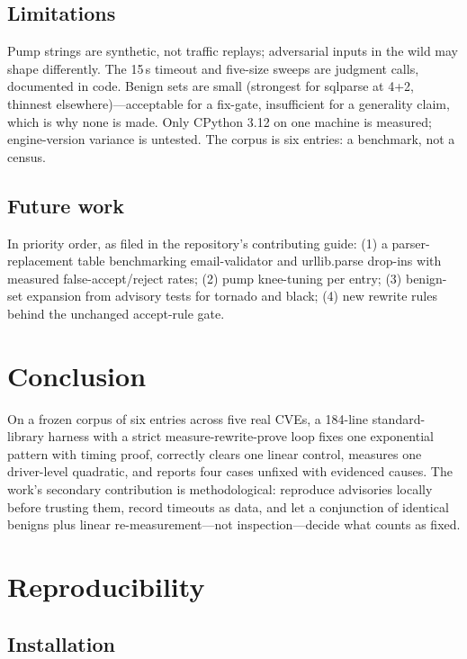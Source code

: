 \documentclass[11pt,a4paper]{article}
\begin{document}
\subsection{Limitations}

Pump strings are synthetic, not traffic replays; adversarial inputs in the wild may shape differently. The 15\,s timeout and five-size sweeps are judgment calls, documented in code. Benign sets are small (strongest for sqlparse at 4+2, thinnest elsewhere)---acceptable for a fix-gate, insufficient for a generality claim, which is why none is made. Only CPython 3.12 on one machine is measured; engine-version variance is untested. The corpus is six entries: a benchmark, not a census.

\subsection{Future work}

In priority order, as filed in the repository's contributing guide: (1) a parser-replacement table benchmarking email-validator and urllib.parse drop-ins with measured false-accept/reject rates; (2) pump knee-tuning per entry; (3) benign-set expansion from advisory tests for tornado and black; (4) new rewrite rules behind the unchanged accept-rule gate.

\section{Conclusion}

On a frozen corpus of six entries across five real CVEs, a 184-line standard-library harness with a strict measure-rewrite-prove loop fixes one exponential pattern with timing proof, correctly clears one linear control, measures one driver-level quadratic, and reports four cases unfixed with evidenced causes. The work's secondary contribution is methodological: reproduce advisories locally before trusting them, record timeouts as data, and let a conjunction of identical benigns plus linear re-measurement---not inspection---decide what counts as fixed.

\section{Reproducibility}
\label{sec:repro}

\subsection{Installation}
\end{document}
